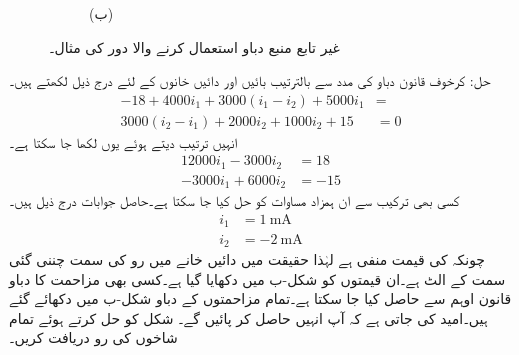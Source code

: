 \begin{figure}
\begin{subfigure}{1\textwidth}
%
\caption*{(ب)}
\end{subfigure}
\caption{غیر تابع منبع دباو استعمال کرنے والا دور کی مثال۔}
\label{شکل_جوڑ_آزاد_منبع_دباو_دائری_مثال_الف}
\end{figure}

حل: کرخوف قانون دباو کی مدد سے بالترتیب بائیں اور دائیں خانوں کے لئے درج ذیل لکھتے ہیں۔
\begin{align*}
-18+4000 i_1 +3000(i_1-i_2)+5000 i_1&=\\
3000(i_2-i_1)+2000 i_2+1000 i_2+15&=0
\end{align*} 
انہیں ترتیب دیتے ہوئے یوں لکھا جا سکتا ہے۔
\begin{align*}
12000 i_1-3000 i_2&=18\\
-3000 i_1+6000 i_2&=-15
\end{align*}
کسی بھی ترکیب سے ان ہمزاد مساوات کو حل کیا جا سکتا ہے۔حاصل جوابات درج ذیل ہیں۔
\begin{align*}
i_1&=\SI{1}{\milli\ampere}\\
i_2&=\SI{-2}{\milli\ampere}
\end{align*}
چونکہ  کی قیمت منفی ہے لہٰذا حقیقت میں دائیں خانے میں رو کی سمت چننی گئی سمت کے الٹ ہے۔ان قیمتوں کو شکل-ب میں دکھایا گیا ہے۔کسی بھی مزاحمت کا دباو قانون اوہم سے حاصل کیا جا سکتا ہے۔تمام مزاحمتوں کے دباو شکل-ب میں دکھائے گئے ہیں۔امید کی جاتی ہے کہ آپ انہیں حاصل کر پائیں گے۔
شکل  کو حل کرتے ہوئے  تمام شاخوں کی رو دریافت کریں۔

